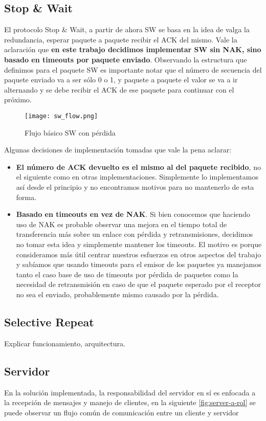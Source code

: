 \documentclass[a4paper,10pt]{article}
\begin{document}
\subsection{Stop \& Wait}
El protocolo Stop \& Wait, a partir de ahora SW se basa en la idea de valga la redundancia, esperar paquete a paquete recibir el ACK del mismo. Vale la aclaración que \textbf{en este trabajo decidimos implementar SW sin NAK, sino basado en timeouts por paquete enviado}.
Observando la estructura que definimos para el paquete SW es importante notar que el número de secuencia del paquete enviado va a ser sólo 0 o 1, y paquete a paquete el valor se va a ir alternando y se debe recibir el ACK de ese paquete para continuar con el próximo.

\begin{figure}[H]
    \centering
    \texttt{[image: sw\_flow.png]}
    \caption{Flujo básico SW con pérdida}
\end{figure}

Algunas decisiones de implementación tomadas que vale la pena aclarar:
\begin{itemize}
    \item \textbf{El número de ACK devuelto es el mismo al del paquete recibido}, no el siguiente como en otras implementaciones. Simplemente lo implementamos así desde el principio y no encontramos motivos para no mantenerlo de esta forma.
    \item \textbf{Basado en timeouts en vez de NAK}. Si bien conocemos que haciendo uso de NAK es probable observar una mejora en el tiempo total de transferencia más sobre un enlace con pérdida y retransmisiones, decidimos no tomar esta idea y simplemente mantener los timeouts. El motivo es porque consideramos más útil centrar nuestros esfuerzos en otros aspectos del trabajo y sabíamos que usando timeouts para el emisor de los paquetes ya manejamos tanto el caso base de uso de timeouts por pérdida de paquetes como la necesidad de retransmisión en caso de que el paquete esperado por el receptor no sea el enviado, probablemente mismo causado por la pérdida.
\end{itemize}

\subsection{Selective Repeat}
Explicar funcionamiento, arquitectura.

\subsection{Servidor}
En la solución implementada, la responsabilidad del servidor en sí es enfocada a la recepción de mensajes y manejo de clientes, en la siguiente \autoref{fig:server-a-rol} se puede observar un flujo común de comunicación entre un cliente y servidor
\end{document}
